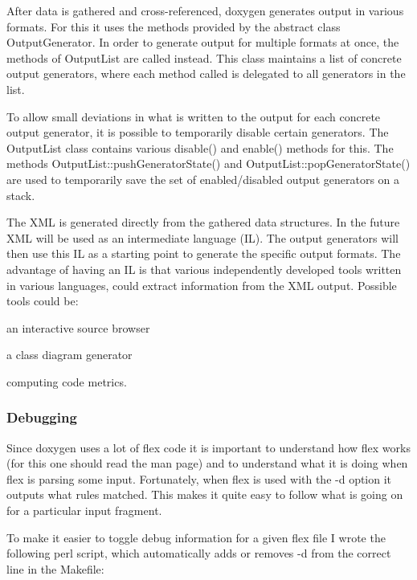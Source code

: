 After data is gathered and cross-\/referenced, doxygen generates output in various formats. For this it uses the methods provided by the abstract class {\ttfamily OutputGenerator}. In order to generate output for multiple formats at once, the methods of {\ttfamily OutputList} are called instead. This class maintains a list of concrete output generators, where each method called is delegated to all generators in the list.

To allow small deviations in what is written to the output for each concrete output generator, it is possible to temporarily disable certain generators. The OutputList class contains various {\ttfamily disable()} and {\ttfamily enable()} methods for this. The methods {\ttfamily OutputList::pushGeneratorState()} and {\ttfamily OutputList::popGeneratorState()} are used to temporarily save the set of enabled/disabled output generators on a stack.

The XML is generated directly from the gathered data structures. In the future XML will be used as an intermediate language (IL). The output generators will then use this IL as a starting point to generate the specific output formats. The advantage of having an IL is that various independently developed tools written in various languages, could extract information from the XML output. Possible tools could be:
\begin{DoxyItemize}
\item an interactive source browser
\item a class diagram generator
\item computing code metrics.
\end{DoxyItemize}

\subsubsection*{Debugging}

Since doxygen uses a lot of {\ttfamily flex} code it is important to understand how {\ttfamily flex} works (for this one should read the man page) and to understand what it is doing when {\ttfamily flex} is parsing some input. Fortunately, when flex is used with the -\/d option it outputs what rules matched. This makes it quite easy to follow what is going on for a particular input fragment.

To make it easier to toggle debug information for a given flex file I wrote the following perl script, which automatically adds or removes -\/d from the correct line in the Makefile:

